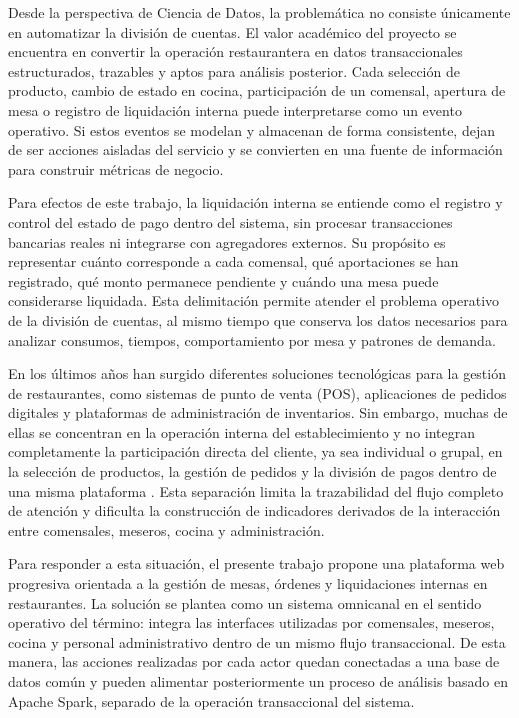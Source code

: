 Desde la perspectiva de Ciencia de Datos, la problemática no consiste únicamente en
automatizar la división de cuentas. El valor académico del proyecto se encuentra en
convertir la operación restaurantera en datos transaccionales estructurados, trazables y
aptos para análisis posterior. Cada selección de producto, cambio de estado en cocina,
participación de un comensal, apertura de mesa o registro de liquidación interna puede
interpretarse como un evento operativo. Si estos eventos se modelan y almacenan de forma
consistente, dejan de ser acciones aisladas del servicio y se convierten en una fuente de
información para construir métricas de negocio.

Para efectos de este trabajo, la liquidación interna se entiende como el registro y
control del estado de pago dentro del sistema, sin procesar transacciones bancarias reales
ni integrarse con agregadores externos. Su propósito es representar cuánto corresponde a
cada comensal, qué aportaciones se han registrado, qué monto permanece pendiente y cuándo
una mesa puede considerarse liquidada. Esta delimitación permite atender el problema
operativo de la división de cuentas, al mismo tiempo que conserva los datos necesarios
para analizar consumos, tiempos, comportamiento por mesa y patrones de demanda.

En los últimos años han surgido diferentes soluciones tecnológicas para la gestión de
restaurantes, como sistemas de punto de venta (POS), aplicaciones de pedidos digitales y
plataformas de administración de inventarios. Sin embargo, muchas de ellas se concentran
en la operación interna del establecimiento y no integran completamente la participación
directa del cliente, ya sea individual o grupal, en la selección de productos, la gestión
de pedidos y la división de pagos dentro de una misma plataforma \cite{katagri_smart_2025}.
Esta separación limita la trazabilidad del flujo completo de atención y dificulta la
construcción de indicadores derivados de la interacción entre comensales, meseros, cocina
y administración.

Para responder a esta situación, el presente trabajo propone una plataforma web progresiva
orientada a la gestión de mesas, órdenes y liquidaciones internas en restaurantes. La
solución se plantea como un sistema omnicanal en el sentido operativo del término: integra
las interfaces utilizadas por comensales, meseros, cocina y personal administrativo dentro
de un mismo flujo transaccional. De esta manera, las acciones realizadas por cada actor
quedan conectadas a una base de datos común y pueden alimentar posteriormente un proceso
de análisis basado en Apache Spark, separado de la operación transaccional del sistema.

